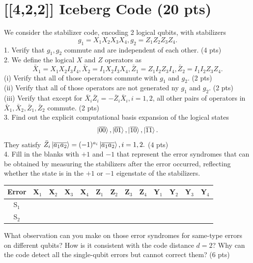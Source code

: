 \documentclass[12pt]{article}
\begin{document}
\section{[[4,2,2]] Iceberg Code (20 pts)}
We consider the stabilizer code, encoding 2 logical qubits, with stabilizers
\[g_1=X_1X_2X_3X_4, g_2=Z_1Z_2Z_3Z_4.\]
1. Verify that $g_1,g_2$ commute and are independent of each other. (4 pts)\\
2. We define the logical $X$ and $Z$ operators as
\[\bar X_1=X_1X_2I_3I_4,\bar X_2=I_1X_2I_3X_4,\bar Z_1=Z_1I_2Z_3I_4,\bar Z_2=I_1I_2Z_3Z_4.\]
(i) Verify that all of those operators commute with $g_1$ and $g_2$. (2 pts)\\
(ii) Verify that all of those operators are not generated ny $g_1$ and $g_2$. (2 pts)\\
(iii) Verify that except for $\bar X_i \bar Z_i=-\bar Z_i\bar X_i,i=1,2$, all other pairs of operators in $\bar X_1,\bar X_2,\bar Z_1,\bar Z_2$ commute. (2 pts)\\
3. Find out the explicit computational basis expansion of the logical states
\[\ket{\overline{00}},\ket{\overline{01}},\ket{\overline{10}},\ket{\overline{11}}.\]
They satisfy $\bar Z_i\ket{\overline{a_1a_2}}=(-1)^{a_i}\ket{\overline{a_1a_2}},i=1,2.$ (4 pts)\\
4. Fill in the blanks with $+1$ and $-1$ that represent the error syndromes that can be obtained by measuring the stabilizers after the error occurred, reflecting whether the state is in the $+1$ or $-1$ eigenstate of the stabilizers.
\begin{table}[ht]
\centering
\begin{tabular}{|c|*{4}{c|}|*{4}{c|}|*{4}{c|}}   %
\hline
Error & X$_1$ & X$_2$ & X$_3$ & X$_4$ & Z$_1$ & Z$_2$ & Z$_3$ & Z$_4$ & Y$_1$ & Y$_2$ & Y$_3$ & Y$_4$ \\
\hline
S$_1$ &       &       &       &       &       &       &       &       &       &       &       &       \\
S$_2$ &       &       &       &       &       &       &       &       &       &       &       &       \\
\hline
\end{tabular}
\end{table}
What observation can you make on those error syndromes for same-type errors on different qubits? How is it consistent with the code distance $d=2$? Why can the code detect all the single-qubit errors but cannot correct them? (6 pts)
\end{document}
